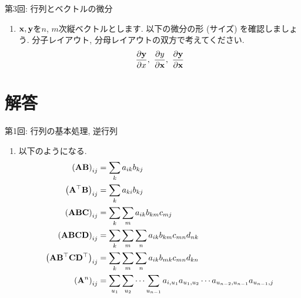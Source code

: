 \documentclass[dvipdfmx,notheorems,t]{beamer}
\begin{document}
\begin{frame}{第3回: 行列とベクトルの微分}
\begin{enumerate}
  \item $\vb{x}, \vb{y}$を$n$, $m$次縦ベクトルとします.
  以下の微分の形 (サイズ) を確認しましょう.
  分子レイアウト, 分母レイアウトの双方で考えてください.
  \begin{align*}
    \pdv{\vb{y}}{x}, \ \pdv{y}{\vb{x}}, \ \pdv{\vb{y}}{\vb{x}}
  \end{align*}
\end{enumerate}
\end{frame}

\begin{frame}{}
\end{frame}

\section{解答}

\begin{frame}{第1回: 行列の基本処理, 逆行列}
\begin{enumerate}
  \item 以下のようになる.
  \begin{align*}
    \left( \vb{A} \vb{B} \right)_{ij} &= \sum_k a_{ik} b_{kj} \\
    \left( \vb{A}^\top \vb{B} \right)_{ij} &= \sum_k a_{ki} b_{kj} \\
    \left( \vb{A} \vb{B} \vb{C} \right)_{ij} &= \sum_k \sum_m a_{ik} b_{km} c_{mj} \\
    \left( \vb{A} \vb{B} \vb{C} \vb{D} \right)_{ij}
      &= \sum_k \sum_m \sum_n a_{ik} b_{km} c_{mn} d_{nk} \\
    \left( \vb{A} \vb{B}^\top \vb{C} \vb{D}^\top \right)_{ij}
      &= \sum_k \sum_m \sum_n a_{ik} b_{mk} c_{mn} d_{kn} \\
    \left( \vb{A}^n \right)_{ij}
      &= \sum_{u_1} \sum_{u_2} \cdots \sum_{u_{n - 1}}
        a_{i, u_1} a_{u_1, u_2} \cdots a_{u_{n - 2}, u_{n - 1}} a_{u_{n - 1}, j}
  \end{align*}
\end{enumerate}
\end{frame}
\end{document}
